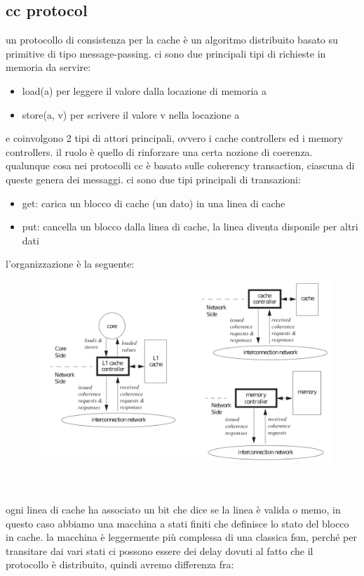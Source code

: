 \documentclass[12pt, oneside]{extbook} %
\begin{document}
\subsection{cc protocol}
un protocollo di consistenza per la cache è un algoritmo distribuito basato su primitive di tipo message-passing. ci sono due principali tipi di richieste in memoria da servire:
\begin{itemize}
\item load(a) per leggere il valore dalla locazione di memoria a
\item store(a, v) per scrivere il valore v nella locazione a
\end{itemize}
e coinvolgono 2 tipi di attori principali, ovvero i cache controllers ed i memory controllers. il ruolo è quello di rinforzare una certa nozione di coerenza.\\ qualunque cosa nei protocolli cc è basato sulle coherency transaction, ciascuna di queste genera dei messaggi. ci sono due tipi principali di transazioni:
\begin{itemize}
\item get: carica un blocco di cache (un dato) in una linea di cache
\item put: cancella un blocco dalla linea di cache, la linea diventa disponile per altri dati
\end{itemize}
l'organizzazione è la seguente:\\
\begin{figure}[!h]
	\includegraphics[scale=0.3]{immagini/cc_arch.png}
\end{figure}\\\\
ogni linea di cache ha associato un bit che dice se la linea è valida o memo, in questo caso abbiamo una macchina a stati finiti che definisce lo stato del blocco in cache. la macchina è leggermente più complessa di una classica fsm, perché per transitare dai vari stati ci possono essere dei delay dovuti al fatto che il protocollo è distribuito, quindi avremo differenza fra:
\end{document}
